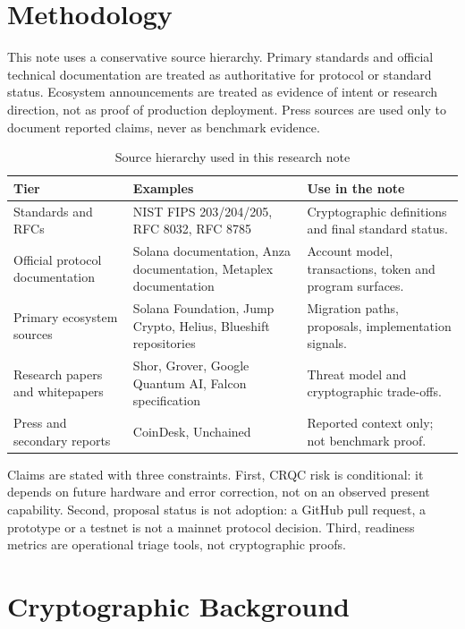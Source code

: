 \documentclass[11pt,a4paper,oneside,parskip=false]{scrartcl}
\begin{document}
\section{Methodology}

This note uses a conservative source hierarchy. Primary standards and official technical documentation are treated as authoritative for protocol or standard status. Ecosystem announcements are treated as evidence of intent or research direction, not as proof of production deployment. Press sources are used only to document reported claims, never as benchmark evidence.

\begin{table}[htbp]
\centering
\caption{Source hierarchy used in this research note}
\label{tab:source-hierarchy}
\small
\begin{tabularx}{\textwidth}{L{0.22\textwidth}Y Y}
\toprule
\textbf{Tier} & \textbf{Examples} & \textbf{Use in the note} \\
\midrule
Standards and RFCs & NIST FIPS 203/204/205, RFC 8032, RFC 8785 & Cryptographic definitions and final standard status. \\
Official protocol documentation & Solana documentation, Anza documentation, Metaplex documentation & Account model, transactions, token and program surfaces. \\
Primary ecosystem sources & Solana Foundation, Jump Crypto, Helius, Blueshift repositories & Migration paths, proposals, implementation signals. \\
Research papers and whitepapers & Shor, Grover, Google Quantum AI, Falcon specification & Threat model and cryptographic trade-offs. \\
Press and secondary reports & CoinDesk, Unchained & Reported context only; not benchmark proof. \\
\bottomrule
\end{tabularx}
\end{table}

Claims are stated with three constraints. First, CRQC risk is conditional: it depends on future hardware and error correction, not on an observed present capability. Second, proposal status is not adoption: a GitHub pull request, a prototype or a testnet is not a mainnet protocol decision. Third, readiness metrics are operational triage tools, not cryptographic proofs.

\section{Cryptographic Background}
\end{document}
